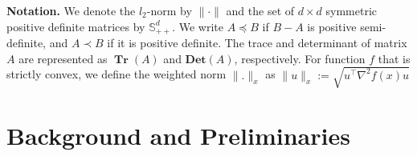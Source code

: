 \documentclass[11pt,letterpaper]{article}
\newcommand{\Det}{\mathbf{Det}}
\newcommand\0{{\Vector{0}}}
\newcommand\1{{\Vector{1}}}
\DeclareMathOperator{\Tr}{\mathbf{Tr}}
\numberwithin{assumption}{section}
\numberwithin{definition}{section}
\numberwithin{theorem}{section}
\numberwithin{remark}{section}
\begin{document}


\noindent\textbf{Notation.} We denote the $l_2$-norm by $\|\cdot\|$ and the set of $d \times d$ symmetric positive definite matrices by $\mathbb{S}^d_{++}$. We write $A \preceq B$ if $B - A$ is positive semi-definite, and $A \prec B$ if it is positive definite. The trace and determinant of matrix $A$ are represented as $\Tr(A)$ and $\Det(A)$, respectively. For function $f$ that is strictly convex, we define the weighted norm $\|.\|_x$ as $\|u\|_x := \sqrt{u^\top \nabla^2{f(x)} u}$

\section{Background and Preliminaries}\label{sec:background}

\end{document}
